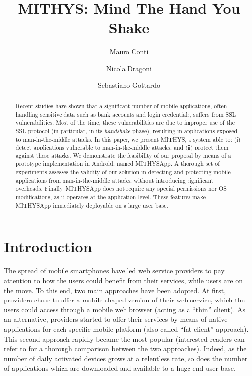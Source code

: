 \documentclass[english]{llncs}
\title{MITHYS: Mind The Hand You Shake} \author{Mauro Conti\inst{1} \and Nicola Dragoni\inst{2} \and Sebastiano Gottardo\inst{1,2}}
\institute{University of Padua, IT 
\\ \url{conti@math.unipd.it, sgottard@studenti.math.unipd.it}
\and
Technical University of Denmark, DK
\\ \url{ndra@dtu.dk, s124645@student.dtu.dk}
}
\begin{document}
\maketitle

\begin{abstract}

Recent studies have shown that a significant number of mobile applications, often handling sensitive data such as bank accounts and login credentials, suffers from SSL vulnerabilities. Most of the time, these vulnerabilities are due to improper use of the SSL protocol (in particular, in its \emph{handshake} phase), resulting in applications exposed to man-in-the-middle attacks. In this paper, we present MITHYS, a system able to: (i) detect applications vulnerable to man-in-the-middle attacks, and (ii) protect them against these attacks. We demonstrate the feasibility of our proposal by means of a prototype implementation in Android, named MITHYSApp. A thorough set of experiments assesses the validity of our solution in detecting and protecting mobile applications from man-in-the-middle attacks, without introducing significant overheads. Finally, MITHYSApp does not require any special permissions nor OS modifications, as it operates at the application level. These features make MITHYSApp immediately deployable on a large user base.

\end{abstract}

\section{Introduction}
\label{Introduction}





The spread of mobile smartphones have led web service providers to pay attention to how the users could benefit from their services, while users are on the move. 
To this end, two main approaches have been adopted. At first, providers chose to offer a mobile-shaped version of their web service, which the users could access through a mobile web browser (acting as a ``thin'' client). As an alternative, providers started to offer their services by means of native applications for each specific mobile platform (also called ``fat client'' approach). This second approach rapidly became the most popular (interested readers can refer to \cite{Charland:2011:MAD:1941487.1941504} for a thorough comparison between the two approaches). Indeed, as the number of daily activated devices grows at a relentless rate, so does the number of applications which are downloaded and available to a huge end-user base. 
\end{document}
